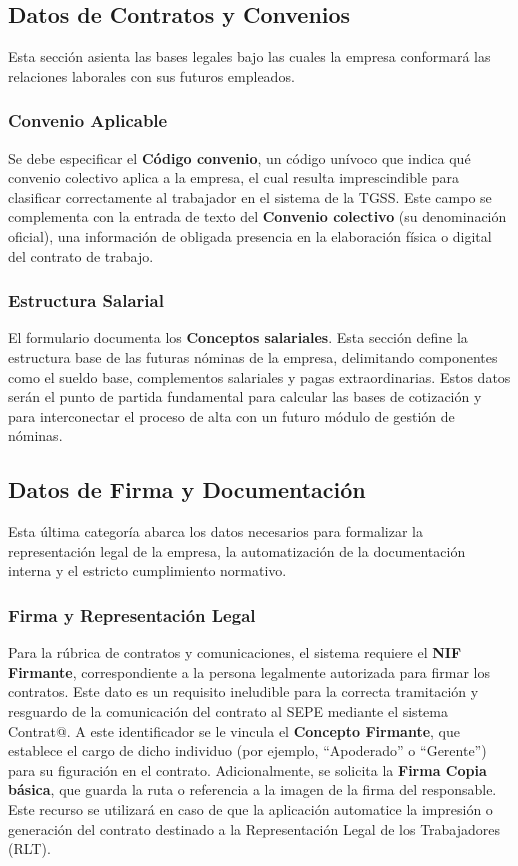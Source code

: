 \subsection{Datos de Contratos y Convenios}

Esta sección asienta las bases legales bajo las cuales la empresa conformará las relaciones laborales con sus futuros empleados.

\subsubsection{Convenio Aplicable}
Se debe especificar el \textbf{Código convenio}, un código unívoco que indica qué convenio colectivo aplica a la empresa, el cual resulta imprescindible para clasificar correctamente al trabajador en el sistema de la TGSS. Este campo se complementa con la entrada de texto del \textbf{Convenio colectivo} (su denominación oficial), una información de obligada presencia en la elaboración física o digital del contrato de trabajo.

\subsubsection{Estructura Salarial}
El formulario documenta los \textbf{Conceptos salariales}. Esta sección define la estructura base de las futuras nóminas de la empresa, delimitando componentes como el sueldo base, complementos salariales y pagas extraordinarias. Estos datos serán el punto de partida fundamental para calcular las bases de cotización y para interconectar el proceso de alta con un futuro módulo de gestión de nóminas.

\subsection{Datos de Firma y Documentación}

Esta última categoría abarca los datos necesarios para formalizar la representación legal de la empresa, la automatización de la documentación interna y el estricto cumplimiento normativo.

\subsubsection{Firma y Representación Legal}
Para la rúbrica de contratos y comunicaciones, el sistema requiere el \textbf{NIF Firmante}, correspondiente a la persona legalmente autorizada para firmar los contratos. Este dato es un requisito ineludible para la correcta tramitación y resguardo de la comunicación del contrato al SEPE mediante el sistema Contrat@. A este identificador se le vincula el \textbf{Concepto Firmante}, que establece el cargo de dicho individuo (por ejemplo, ``Apoderado'' o ``Gerente'') para su figuración en el contrato. Adicionalmente, se solicita la \textbf{Firma Copia básica}, que guarda la ruta o referencia a la imagen de la firma del responsable. Este recurso se utilizará en caso de que la aplicación automatice la impresión o generación del contrato destinado a la Representación Legal de los Trabajadores (RLT).

